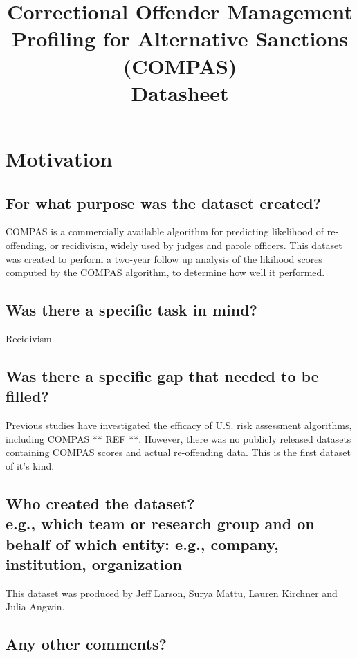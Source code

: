 \documentclass[letterpaper, 10 pt, conference]{ieeeconf}  %
\title{\LARGE \bf
Correctional Offender Management Profiling for Alternative Sanctions (COMPAS) \\{\color{blue}Datasheet}
}
\newcommand{\subtitle}[1]{{\\ \small \normalfont \color{purple} #1}}
\begin{document}
\maketitle
\thispagestyle{empty}
\pagestyle{empty}

\section{Motivation}

\subsection{For what purpose was the dataset created?}

COMPAS is a commercially available algorithm for predicting likelihood of re-offending, or recidivism, widely used by judges and parole officers. This dataset was created to perform a two-year follow up analysis of the likihood scores computed by the COMPAS algorithm, to determine how well it performed.  

\subsection{Was there a specific task in mind?}

Recidivism

\subsection{Was there a specific gap that needed to be filled?}

Previous studies have investigated the efficacy of U.S. risk assessment algorithms, including COMPAS ** REF **. However, there was no publicly released datasets containing COMPAS scores and actual re-offending data. This is the first dataset of it's kind. 

\subsection{Who created the dataset? \subtitle{e.g., which team or research group and on behalf of which entity: e.g., company, institution, organization}}

This dataset was produced by Jeff Larson, Surya Mattu, Lauren Kirchner and Julia Angwin.

\subsection{Any other comments?}
\end{document}
